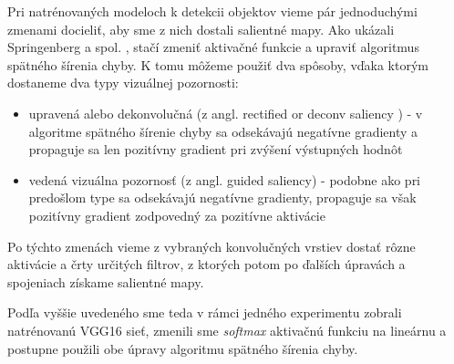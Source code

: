 Pri natrénovaných modeloch k detekcii objektov vieme pár jednoduchými zmenami docieliť, aby sme z nich dostali salientné mapy. Ako ukázali Springenberg a spol. \cite{springenberg2014striving}, stačí zmeniť aktivačné funkcie a upraviť algoritmus spätného šírenia chyby. K tomu môžeme použiť dva spôsoby, vďaka ktorým dostaneme dva typy vizuálnej pozornosti:

\begin{itemize}
	\item upravená alebo dekonvolučná (z angl.  rectified or deconv saliency \cite{zeiler2014visualizing}) - v algoritme spätného šírenie chyby sa odsekávajú negatívne gradienty a propaguje sa len pozitívny gradient pri zvýšení výstupných hodnôt
	\item vedená vizuálna pozornosť (z angl. guided saliency) - podobne ako pri predošlom type sa odsekávajú negatívne gradienty, propaguje sa však pozitívny gradient zodpovedný za pozitívne aktivácie
\end{itemize}

Po týchto zmenách vieme z vybraných konvolučných vrstiev dostať rôzne aktivácie a črty určitých filtrov, z ktorých potom po ďalších úpravách a spojeniach získame salientné mapy.

Podľa vyššie uvedeného sme teda v rámci jedného experimentu zobrali natrénovanú VGG16 sieť, zmenili sme \textit{softmax} aktivačnú funkciu na lineárnu a postupne použili obe úpravy algoritmu spätného šírenia chyby.




